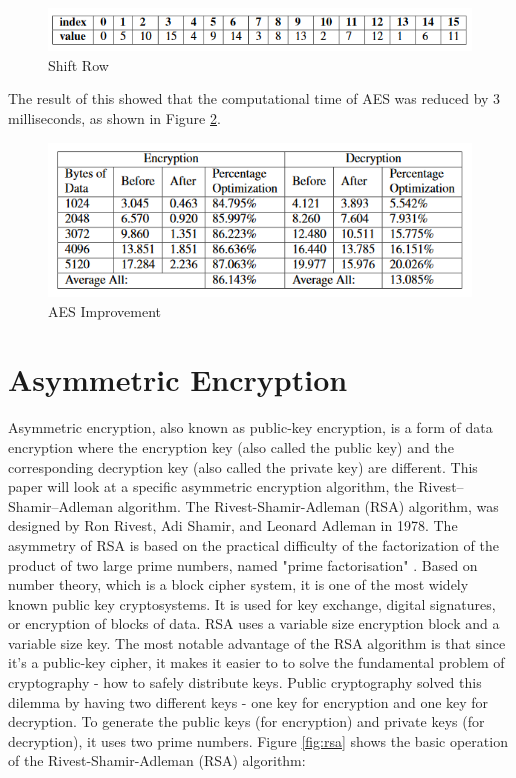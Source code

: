 \documentclass[journal]{IEEEtran}
\begin{document}
\newline
\begin{figure}[!h]
    \centering
    \includegraphics[scale=.5]{shift_row}
    \caption{Shift Row}
    \label{fig:aes_shift_row}
\end{figure}

The result of this showed that the computational time of AES was reduced by 3 milliseconds, as shown in Figure \ref{fig:aes_new_times}.

\newline
\begin{figure}[!h]
    \centering
    \includegraphics[scale=.7]{aes_improvement}
    \caption{AES Improvement}
    \label{fig:aes_new_times}
\end{figure}

\section{\textbf{Asymmetric Encryption}}
Asymmetric encryption, also known as public-key encryption, is a form of data encryption where the encryption key (also called the public key) and the corresponding decryption key (also called the private key) are different. This paper will look at a specific asymmetric encryption algorithm, the Rivest–Shamir–Adleman algorithm. The Rivest-Shamir-Adleman (RSA) algorithm, was designed by Ron Rivest, Adi Shamir, and Leonard Adleman in 1978. The asymmetry of RSA is based on the practical difficulty of the factorization of the product of two large prime numbers, named "prime factorisation" \cite{prime_factorization}. Based on number theory, which is a block cipher system, it is one of the most widely known public key cryptosystems. It is used for key exchange, digital signatures, or encryption of blocks of data. RSA uses a variable size encryption block and a variable size key. The most notable advantage of the RSA algorithm is that since it's a public-key cipher, it makes it easier to to solve the fundamental problem of cryptography - how to safely distribute keys. Public cryptography solved this dilemma by having two different keys - one key for encryption and one key for decryption. To generate the public keys (for encryption) and private keys (for decryption), it uses two prime numbers. Figure \ref{fig:rsa} shows the basic operation of the Rivest-Shamir-Adleman (RSA) algorithm:
\end{document}
